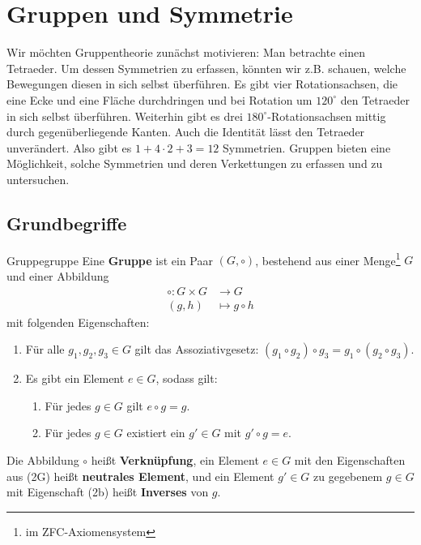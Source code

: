 \section{Gruppen und Symmetrie}
\label{gruppentheorie}

\begin{bemerkung}
Wir möchten Gruppentheorie zunächst motivieren: Man betrachte einen Tetraeder. Um dessen Symmetrien zu erfassen, könnten wir z.B. schauen, welche Bewegungen diesen in sich selbst überführen. Es gibt vier Rotationsachsen, die eine Ecke und eine Fläche durchdringen und bei Rotation um $120^\circ$ den Tetraeder in sich selbst überführen. Weiterhin gibt es drei $180^\circ$-Rotationsachsen mittig durch gegenüberliegende Kanten. Auch die Identität lässt den Tetraeder unverändert. Also gibt es $1+4 \cdot 2 + 3 = 12$ Symmetrien. Gruppen bieten eine Möglichkeit, solche Symmetrien und deren Verkettungen zu erfassen und zu untersuchen.
\end{bemerkung}

\subsection{Grundbegriffe}
\label{subsec:grundbegriffe}

\begin{definition}{Gruppe}{gruppe}
Eine \textbf{Gruppe} ist ein Paar $(G, \circ)$, bestehend aus einer Menge\footnote{im ZFC-Axiomensystem} $G$ und einer Abbildung
\begin{align}
\circ: G \times G &\to G\\
(g,h) &\mapsto g \circ h
\end{align} 
mit folgenden Eigenschaften:
\begin{enumerate}[({G}1)]
\item Für alle $g_1,g_2,g_3 \in G$ gilt das Assoziativgesetz: $(g_1 \circ g_2) \circ g_3 = g_1 \circ (g_2 \circ g_3)$.
\item Es gibt ein Element $e \in G$, sodass gilt:
\begin{enumerate}[({2}a)]
\item Für jedes $g \in G$ gilt $e \circ g = g$.
\item Für jedes $g \in G$ existiert ein $g' \in G$ mit $g' \circ g = e$.
\end{enumerate}
\end{enumerate}
Die Abbildung $\circ$ heißt \textbf{Verknüpfung}, ein Element $e \in G$ mit den Eigenschaften aus (2G) heißt \textbf{neutrales Element}, und ein Element $g' \in G$ zu gegebenem $g \in G$ mit Eigenschaft (2b) heißt \textbf{Inverses} von $g$.
\end{definition}

